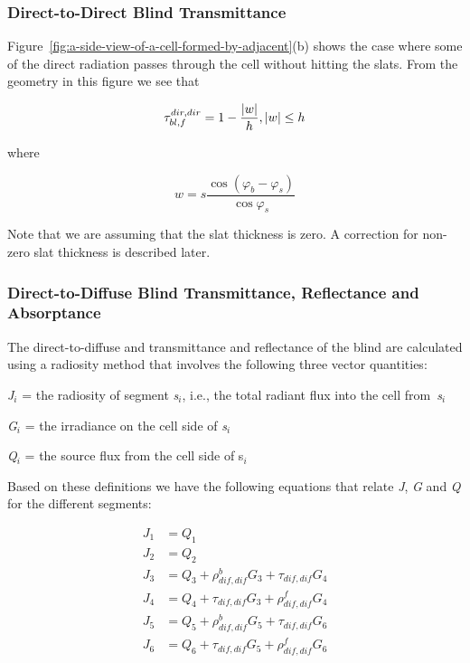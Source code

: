 \subsubsection{Direct-to-Direct Blind Transmittance}\label{direct-to-direct-blind-transmittance}

Figure~\ref{fig:a-side-view-of-a-cell-formed-by-adjacent}(b) shows the case where some of the direct radiation passes through the cell without hitting the slats. From the geometry in this figure we see that

\begin{equation}
\tau_{bl,f}^{dir,dir} = 1 - \frac{{|w|}}{h},{\rm{       }}|w|{\rm{ }} \le {\rm{ }}h
\end{equation}

where

\begin{equation}
w = s\frac{{\cos ({\varphi_b} - {\varphi_s})}}{{\cos {\varphi_s}}}
\end{equation}

Note that we are assuming that the slat thickness is zero. A correction for non-zero slat thickness is described later.

\subsubsection{Direct-to-Diffuse Blind Transmittance, Reflectance and Absorptance}\label{direct-to-diffuse-blind-transmittance-reflectance-and-absorptance}

The direct-to-diffuse and transmittance and reflectance of the blind are calculated using a radiosity method that involves the following three vector quantities:

\emph{J\(_{i}\)} = the radiosity of segment \emph{s\(_{i}\)}, i.e., the total radiant flux into the cell from~\emph{s\(_{i}\)}

\emph{G\(_{i}\)} = the irradiance on the cell side of \emph{s\(_{i}\)}

\emph{Q\(_{i}\)} = the source flux from the cell side of s\emph{\(_{i}\)}

Based on these definitions we have the following equations that relate \emph{J}, \emph{G} and \emph{Q} for the different segments:

\begin{equation}
  \begin{array}{rl}
    J_1 & = Q_1 \\
    J_2 & = Q_2 \\
    J_3 & = Q_3 + \rho_{dif,dif}^b G_3 + \tau_{dif,dif} G_4 \\
    J_4 & = Q_4 + \tau_{dif,dif} G_3 + \rho_{dif,dif}^f G_4 \\
    J_5 & = Q_5 + \rho_{dif,dif}^b G_5 + \tau_{dif,dif} G_6 \\
    J_6 & = Q_6 + \tau_{dif,dif} G_5 + \rho_{dif,dif}^f G_6
  \end{array}
\end{equation}

